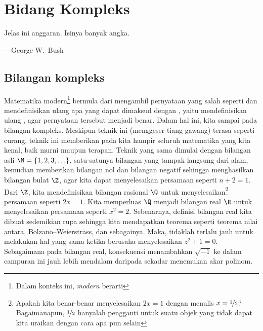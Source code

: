 
\chapter{Bidang Kompleks} \label{ch:complexplane}

\begin{myepigraph}
Jelas ini anggaran. Isinya banyak angka.

---George W.\ Bush
\end{myepigraph}


\section{Bilangan kompleks} \label{sec:complexnums}

Matematika modern\footnote{Dalam konteks ini, \emph{modern} berarti
}
bermula dari mengambil pernyataan yang salah seperti
 dan mendefinisikan ulang apa yang dapat
dimaksud dengan , yaitu mendefinisikan ulang ,
agar pernyataan tersebut menjadi benar.
Dalam hal ini, kita sampai pada bilangan kompleks.
Meskipun teknik ini (menggeser tiang gawang) terasa seperti curang, teknik ini
memberikan pada kita hampir seluruh matematika yang kita kenal, baik murni
maupun terapan.
Teknik yang sama dimulai dengan bilangan asli
$\N = \{ 1,2,3,\ldots \}$, satu-satunya
bilangan yang tampak langsung dari alam,
kemudian memberikan bilangan nol dan bilangan negatif sehingga menghasilkan
bilangan bulat $\Z$, agar kita dapat menyelesaikan persamaan
seperti $n+2 = 1$.
Dari $\Z$, kita mendefinisikan bilangan rasional
$\Q$ untuk menyelesaikan\footnote{%
Apakah kita benar-benar menyelesaikan $2x=1$ dengan menulis
$x = \nicefrac{1}{2}$? Bagaimanapun, $\nicefrac{1}{2}$ hanyalah pengganti
untuk suatu objek yang tidak dapat kita uraikan dengan cara apa pun selain
}
persamaan seperti $2x=1$.
Kita memperluas $\Q$ menjadi bilangan real $\R$
untuk menyelesaikan persamaan seperti $x^2=2$.
Sebenarnya, definisi bilangan real kita dibuat sedemikian rupa sehingga kita
mendapatkan teorema seperti teorema nilai antara, Bolzano--Weierstrass,
dan sebagainya.
Maka, tidaklah terlalu jauh untuk melakukan hal yang sama ketika berusaha
menyelesaikan $z^2+1=0$.
Sebagaimana pada bilangan real, konsekuensi menambahkan $\sqrt{-1}$ ke dalam
campuran ini jauh lebih mendalam daripada sekadar menemukan akar polinom.

